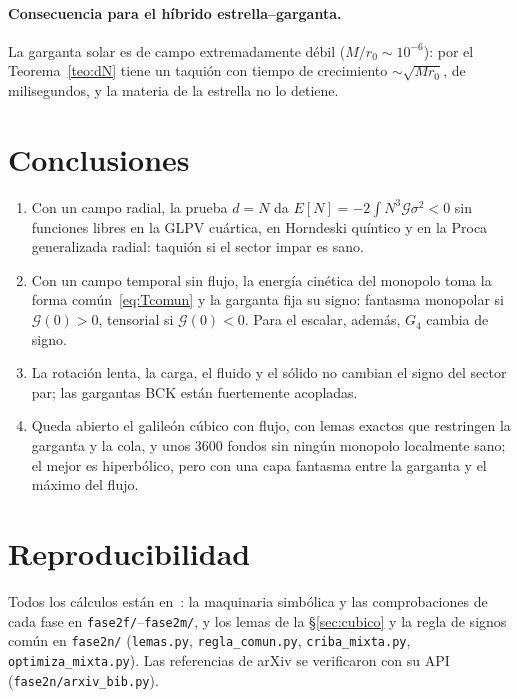 \documentclass[11pt,a4paper]{article}
\theoremstyle{remark}
\newcommand{\G}{\mathcal G}
\begin{document}
\paragraph{Consecuencia para el híbrido estrella--garganta.} La garganta solar es de campo extremadamente débil ($M/r_0\sim10^{-6}$): por el Teorema~\ref{teo:dN} tiene un taquión con tiempo de crecimiento $\sim\sqrt{Mr_0}$, de milisegundos, y la materia de la estrella no lo detiene.

\section{Conclusiones}

\begin{enumerate}
\item Con un campo radial, la prueba $d=N$ da $E[N]=-2\int N^3\G\sigma^2<0$ sin funciones libres en la GLPV cuártica, en Horndeski quíntico y en la Proca generalizada radial: taquión si el sector impar es sano.
\item Con un campo temporal sin flujo, la energía cinética del monopolo toma la forma común~\eqref{eq:Tcomun} y la garganta fija su signo: fantasma monopolar si $\G(0)>0$, tensorial si $\G(0)<0$. Para el escalar, además, $G_4$ cambia de signo.
\item La rotación lenta, la carga, el fluido y el sólido no cambian el signo del sector par; las gargantas BCK están fuertemente acopladas.
\item Queda abierto el galileón cúbico con flujo, con lemas exactos que restringen la garganta y la cola, y unos 3600 fondos sin ningún monopolo localmente sano; el mejor es hiperbólico, pero con una capa fantasma entre la garganta y el máximo del flujo.
\end{enumerate}

\appendix
\section{Reproducibilidad}
Todos los cálculos están en~\cite{repo}: la maquinaria simbólica y las comprobaciones de cada fase en \texttt{fase2f/}--\texttt{fase2m/}, y los lemas de la \S\ref{sec:cubico} y la regla de signos común en \texttt{fase2n/} (\texttt{lemas.py}, \texttt{regla\_comun.py}, \texttt{criba\_mixta.py}, \texttt{optimiza\_mixta.py}). Las referencias de arXiv se verificaron con su API (\texttt{fase2n/arxiv\_bib.py}).
\end{document}
